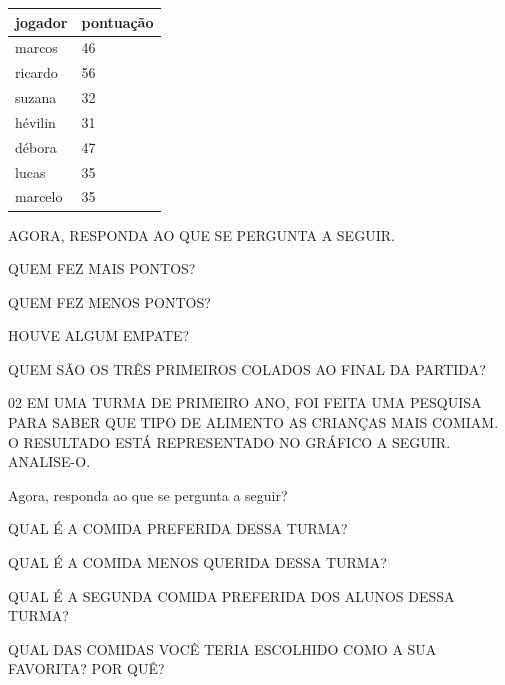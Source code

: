 
\begin{longtable}[]{@{}ll@{}}
\toprule
jogador & pontuação\tabularnewline
\midrule
\endhead
marcos & 46\tabularnewline
ricardo & 56\tabularnewline
suzana & 32\tabularnewline
hévilin & 31\tabularnewline
débora & 47\tabularnewline
lucas & 35\tabularnewline
marcelo & 35\tabularnewline
\bottomrule
\end{longtable}

AGORA, RESPONDA AO QUE SE PERGUNTA A SEGUIR.

\begin{escolha}
\item QUEM FEZ MAIS PONTOS?


\item QUEM FEZ MENOS PONTOS?


\item HOUVE ALGUM EMPATE?


\item QUEM SÃO OS TRÊS PRIMEIROS COLADOS AO FINAL DA PARTIDA?

\end{escolha}

\num{02} EM UMA TURMA DE PRIMEIRO ANO, FOI FEITA UMA PESQUISA PARA SABER QUE TIPO DE ALIMENTO AS
CRIANÇAS MAIS COMIAM. O RESULTADO ESTÁ REPRESENTADO NO GRÁFICO A SEGUIR. ANALISE-O.


Agora, responda ao que se pergunta a seguir?

\begin{escolha}
\item QUAL É A COMIDA PREFERIDA DESSA TURMA?


\item QUAL É A COMIDA MENOS QUERIDA DESSA TURMA?


\item QUAL É A SEGUNDA COMIDA PREFERIDA DOS ALUNOS DESSA TURMA?


\item QUAL DAS COMIDAS VOCÊ TERIA ESCOLHIDO COMO A SUA FAVORITA? POR QUÊ?

\end{escolha}

